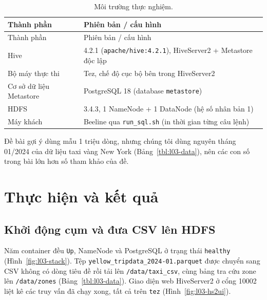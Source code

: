 \documentclass[
  12pt,
  a4paper,
]{article}
\begin{document}
\begin{longtable}[]{@{}ll@{}}
\caption{\label{tbl:l03-env}Môi trường thực nghiệm.}\tabularnewline
\toprule\noalign{}
Thành phần & Phiên bản / cấu hình \\
\midrule\noalign{}
\endfirsthead
\toprule\noalign{}
Thành phần & Phiên bản / cấu hình \\
\midrule\noalign{}
\endhead
\bottomrule\noalign{}
\endlastfoot
Hive & 4.2.1
(\texttt{apache/}\allowbreak{}\texttt{hive:}\allowbreak{}\texttt{4.}\allowbreak{}\texttt{2.}\allowbreak{}\texttt{1}\allowbreak{}),
HiveServer2 + Metastore độc lập \\
Bộ máy thực thi & Tez, chế độ cục bộ bên trong HiveServer2 \\
Cơ sở dữ liệu Metastore & PostgreSQL 18 (database \texttt{metastore}) \\
HDFS & 3.4.3, 1 NameNode + 1 DataNode (hệ số nhân bản 1) \\
Máy khách & Beeline qua \texttt{run\_sql.sh} (in thời gian từng câu
lệnh) \\
\end{longtable}

Đề bài gợi ý dùng mẫu 1 triệu dòng, nhưng chúng tôi dùng nguyên tháng
01/2024 của dữ liệu taxi vàng New York (Bảng~\ref{tbl:l03-data}), nên
các con số trong bài lớn hơn số tham khảo của đề.

\section{Thực hiện và kết quả}\label{sec:l03-results}

\subsection{Khởi động cụm và đưa CSV lên HDFS}\label{sec:l03-res-stack}

Năm container đều \texttt{Up}, NameNode và PostgreSQL ở trạng thái
\texttt{healthy} (Hình~\ref{fig:l03-stack}). Tệp
\texttt{yellow\_}\allowbreak{}\texttt{tripdata\_}\allowbreak{}\texttt{2024-01.}\allowbreak{}\texttt{parquet}\allowbreak{}
được chuyển sang CSV không có dòng tiêu đề rồi tải lên
\texttt{/data/taxi\_csv}, cùng bảng tra cứu zone lên
\texttt{/data/zones} (Bảng~\ref{tbl:l03-data}). Giao diện web
HiveServer2 ở cổng 10002 liệt kê các truy vấn đã chạy xong, tất cả trên
\texttt{tez} (Hình~\ref{fig:l03-hs2ui}).
\end{document}
